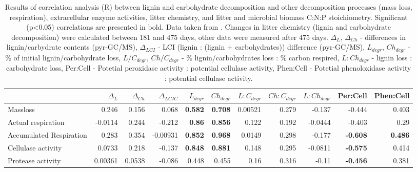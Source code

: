 \documentclass[10pt]{article}
\begin{document}
\begin{flushleft}
\begin{landscape}
\begin{table}[h!]
\begin{center}
{\begin{tabular}{lrrrrrrrrrr}
   \hline
\end{tabular}
}
\end{center}
\end{table}
\newpage
\begin{table}[h!]
\begin{center}
\caption{Results of correlation analysis (R) between lignin and carbohydrate decomposition and other decomposition processes (mass loss, respiration), extracellular enzyme activities, litter chemistry, and litter and microbial biomass C:N:P stoichiometry. Significant (p\textless 0.05) correlations are presented in bold. Data taken from \cite{Mooshammer2011, Leitner2011}. Changes in litter chemistry (lignin and carbohydrate decomposition) were calculated between 181 and 475 days, other data were measured after 475 days. $\Delta _{L}$, $\Delta _{Ch}$ - differences in lignin/carbydrate contents (pyr-GC/MS), $\Delta _{LCI}$ - LCI (lignin : (lignin + carbohydrates)) difference (pyr-GC/MS), $L_{degr}$, $Ch_{degr}$ - \% of initial lignin/carbohydrate loss, $L/C_{degr}$, $Ch/C_{degr}$  - \% lignin/carbohydrates loss : \% carbon respired, $L:Ch_{degr}$ - lignin loss : carbohydrate loss, Per:Cell - Potetial peroxidase activity : potential cellulase activity, Phen:Cell - Potetial phenoloxidase activity : potential cellulase activity.}
\label{corrtable2}
{\small
\begin{tabular}{lrrrrrrrrrr}
  \hline
 & $\Delta _{L}$ & $\Delta _{Ch}$ & $\Delta _{LCIC}$ & $L_{degr}$ & $Ch_{degr}$ & $L:C_{degr}$ & $Ch:C_{degr}$ & $L:Ch_{degr}$ & Per:Cell & Phen:Cell \\ 
  \hline
Massloss & 0.246 & 0.156 & 0.068 & \textbf{ 0.582 } & \textbf{ 0.708 } & 0.00521 & 0.279 & -0.137 & -0.444 & 0.403 \\ 
  Actual respiration & -0.0114 & 0.244 & -0.212 & \textbf{ 0.86 } & \textbf{ 0.856 } & 0.122 & 0.192 & -0.0444 & -0.403 & 0.29 \\ 
  Accumulated Respiration & 0.283 & 0.354 & -0.00931 & \textbf{ 0.852 } & \textbf{ 0.968 } & 0.0149 & 0.298 & -0.177 & \textbf{ -0.608 } & \textbf{ 0.486 } \\ 
  Cellulase activity & 0.0733 & 0.218 & -0.137 & \textbf{ 0.848 } & \textbf{ 0.881 } & 0.148 & 0.295 & -0.0811 & \textbf{ -0.575 } & 0.414 \\ 
  Protease activity & 0.00361 & 0.0538 & -0.086 & 0.448 & 0.455 & 0.16 & 0.316 & -0.11 & \textbf{ -0.456 } & 0.381 \\ 

\end{tabular}}
\end{center}
\end{table}
\end{landscape}
\end{flushleft}
\end{document}
